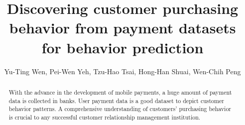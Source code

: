 \documentclass[sigconf]{acmart}
\begin{document}
\title{Discovering customer purchasing behavior from payment datasets for behavior prediction}

\author{Yu-Ting Wen, Pei-Wen Yeh, Tzu-Hao Tsai, Hong-Han Shuai, Wen-Chih Peng}

\newcommand\mycommfont[1]{\footnotesize{#1}}
\renewcommand{\shortauthors}{Y.-T. Wen et al.}

\begin{abstract}
With the advance in the development of mobile payments, a huge amount of payment data is collected in banks. User payment data is a good dataset to depict customer behavior patterns.
A comprehensive understanding of customers' purchasing behavior is crucial to any successful customer relationship management institution. 

\end{abstract}
\end{document}

